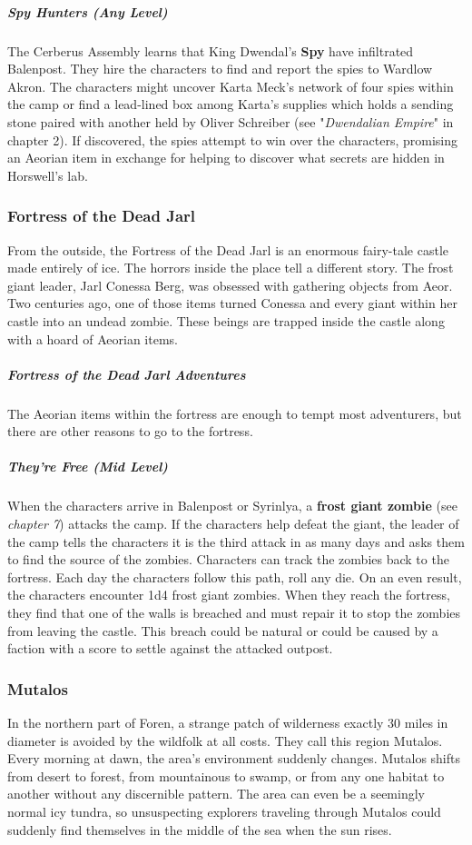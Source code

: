 \documentclass[10pt,a4paper,twoside,bg=print,twocolumn,openany,nodeprecatedcode]{dndbook}
\begin{document}
\subparagraph{Spy Hunters (Any Level)}
The Cerberus Assembly learns that King Dwendal's \textbf{Spy} have infiltrated Balenpost. They hire the characters to find and report the spies to Wardlow Akron. The characters might uncover Karta Meck's network of four spies within the camp or find a lead-lined box among Karta's supplies which holds a sending stone paired with another held by Oliver Schreiber (see "\textit{Dwendalian Empire}" in chapter 2). If discovered, the spies attempt to win over the characters, promising an Aeorian item in exchange for helping to discover what secrets are hidden in Horswell's lab.

\subsubsection{Fortress of the Dead Jarl}
From the outside, the Fortress of the Dead Jarl is an enormous fairy-tale castle made entirely of ice. The horrors inside the place tell a different story. The frost giant leader, Jarl Conessa Berg, was obsessed with gathering objects from Aeor. Two centuries ago, one of those items turned Conessa and every giant within her castle into an undead zombie. These beings are trapped inside the castle along with a hoard of Aeorian items.

\subparagraph{Fortress of the Dead Jarl Adventures}
The Aeorian items within the fortress are enough to tempt most adventurers, but there are other reasons to go to the fortress.

\subparagraph{They're Free (Mid Level)}
When the characters arrive in Balenpost or Syrinlya, a \textbf{frost giant zombie} (see \textit{chapter 7}) attacks the camp. If the characters help defeat the giant, the leader of the camp tells the characters it is the third attack in as many days and asks them to find the source of the zombies. Characters can track the zombies back to the fortress. Each day the characters follow this path, roll any die. On an even result, the characters encounter 1d4 frost giant zombies. When they reach the fortress, they find that one of the walls is breached and must repair it to stop the zombies from leaving the castle. This breach could be natural or could be caused by a faction with a score to settle against the attacked outpost.

\subsubsection{Mutalos}
In the northern part of Foren, a strange patch of wilderness exactly 30 miles in diameter is avoided by the wildfolk at all costs. They call this region Mutalos. Every morning at dawn, the area's environment suddenly changes. Mutalos shifts from desert to forest, from mountainous to swamp, or from any one habitat to another without any discernible pattern. The area can even be a seemingly normal icy tundra, so unsuspecting explorers traveling through Mutalos could suddenly find themselves in the middle of the sea when the sun rises.
\end{document}
